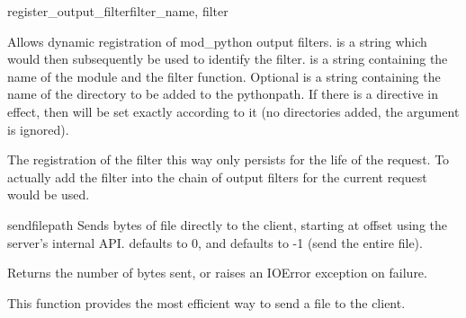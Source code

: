 \begin{methoddesc}[request]{register_output_filter}{filter_name, filter}

  Allows dynamic registration of mod_python output filters. 
  is a string which would then subsequently be used to identify the filter.
   is a string containing the name of the module and the filter
  function. Optional  is a string containing the name of the directory
  to be added to the pythonpath. If there is a  directive in
  effect, then  will be set exactly according to it (no
  directories added, the  argument is ignored).

  The registration of the filter this way only persists for the life of the
  request. To actually add the filter into the chain of output filters for
  the current request  would be used.

\end{methoddesc}

\begin{methoddesc}[request]{sendfile}{path}
  Sends  bytes of file  directly to the client,
  starting at offset  using the server's internal
  API.  defaults to 0, and  defaults to -1 (send
  the entire file). 

  Returns the number of bytes sent, or raises an IOError exception
  on failure.

  This function provides the most efficient way to send a file to the
  client.
\end{methoddesc}

